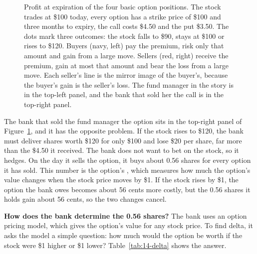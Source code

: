 \begin{figure}[htbp]
{%
}
\caption{Profit at expiration of the four basic option positions. The stock trades at \$100 today, every option has a strike price of \$100 and three months to expiry, the call costs \$4.50 and the put \$3.50. The dots mark three outcomes: the stock falls to \$90, stays at \$100 or rises to \$120. Buyers (navy, left) pay the premium, risk only that amount and gain from a large move. Sellers (red, right) receive the premium, gain at most that amount and bear the loss from a large move. Each seller's line is the mirror image of the buyer's, because the buyer's gain is the seller's loss. The fund manager in the story is in the top-left panel, and the bank that sold her the call is in the top-right panel.}
\label{fig:14-four-payoffs}
\end{figure}

The bank that sold the fund manager the option sits in the top-right panel of Figure~\ref{fig:14-four-payoffs}, and it has the opposite problem. If the stock rises to \$120, the bank must deliver shares worth \$120 for only \$100 and lose \$20 per share, far more than the \$4.50 it received. The bank does not want to bet on the stock, so it hedges. On the day it sells the option, it buys about 0.56 shares for every option it has sold. This number is the option's , which measures how much the option's value changes when the stock price moves by \$1. If the stock rises by \$1, the option the bank owes becomes about 56 cents more costly, but the 0.56 shares it holds gain about 56 cents, so the two changes cancel.

\textbf{How does the bank determine the 0.56 shares?} The bank uses an option pricing model, which gives the option's value for any stock price. To find delta, it asks the model a simple question: how much would the option be worth if the stock were \$1 higher or \$1 lower? Table~\ref{tab:14-delta} shows the answer.

